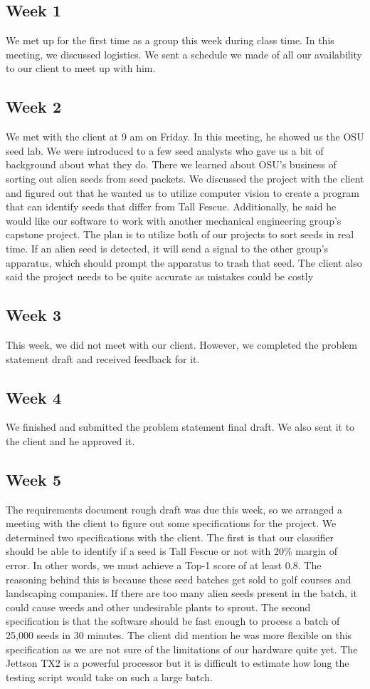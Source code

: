 \documentclass[onecolumn, draftclsnofoot,10pt, compsoc]{IEEEtran}
\begin{document}
	\subsection{Week 1}
	We met up for the first time as a group this week during class time. In this meeting, we discussed logistics. We sent a schedule we made of all our availability to our client to meet up with him.
	\subsection{Week 2}
	We met with the client at 9 am on Friday. In this meeting, he showed us the OSU seed lab. We were introduced to a few seed analysts who gave us a bit of background about what they do. There we learned about OSU's business of sorting out alien seeds from seed packets. We discussed the project with the client and figured out that he wanted us to utilize computer vision to create a program that can identify seeds that differ from Tall Fescue. Additionally, he said he would like our software to work with another mechanical engineering group's capstone project. The plan is to utilize both of our projects to sort seeds in real time. If an alien seed is detected, it will send a signal to the other group's apparatus, which should prompt the apparatus to trash that seed. The client also said the project needs to be quite accurate as mistakes could be costly 
	\subsection{Week 3}
	This week, we did not meet with our client. However, we completed the problem statement draft and received feedback for it. 
	\subsection{Week 4}
	We finished and submitted the problem statement final draft. We also sent it to the client and he approved it. 
	\subsection{Week 5}
	The requirements document rough draft was due this week, so we arranged a meeting with the client to figure out some specifications for the project. We determined two specifications with the client. The first is that our classifier should be able to identify if a seed is Tall Fescue or not with 20\% margin of error. In other words, we must achieve a Top-1 score of at least 0.8. The reasoning behind this is because these seed batches get sold to golf courses and landscaping companies. If there are too many alien seeds present in the batch, it could cause weeds and other undesirable plants to sprout. The second specification is that the software should be fast enough to process a batch of 25,000 seeds in 30 minutes. The client did mention he was more flexible on this specification as we are not sure of the limitations of our hardware quite yet. The Jettson TX2 is a powerful processor but it is difficult to estimate how long the testing script would take on such a large batch.
\end{document}
